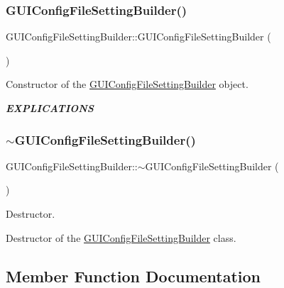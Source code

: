 \subsubsection{\texorpdfstring{G\+U\+I\+Config\+File\+Setting\+Builder()}{GUIConfigFileSettingBuilder()}}
{\footnotesize\ttfamily G\+U\+I\+Config\+File\+Setting\+Builder\+::\+G\+U\+I\+Config\+File\+Setting\+Builder (\begin{DoxyParamCaption}{ }\end{DoxyParamCaption})}



Constructor of the \mbox{\hyperlink{class_g_u_i_config_file_setting_builder}{G\+U\+I\+Config\+File\+Setting\+Builder}} object. 

{\itshape {\bfseries E\+X\+P\+L\+I\+C\+A\+T\+I\+O\+NS}} \mbox{\label{class_g_u_i_config_file_setting_builder_a45d779dad296769d2877cfeec2fcb60c}} 
\subsubsection{\texorpdfstring{$\sim$\+G\+U\+I\+Config\+File\+Setting\+Builder()}{~GUIConfigFileSettingBuilder()}}
{\footnotesize\ttfamily G\+U\+I\+Config\+File\+Setting\+Builder\+::$\sim$\+G\+U\+I\+Config\+File\+Setting\+Builder (\begin{DoxyParamCaption}{ }\end{DoxyParamCaption})}



Destructor. 

Destructor of the \mbox{\hyperlink{class_g_u_i_config_file_setting_builder}{G\+U\+I\+Config\+File\+Setting\+Builder}} class. 

\subsection{Member Function Documentation}
\mbox{\label{class_g_u_i_config_file_setting_builder_abbaa15d81d247c3bca68a03e31b78e3e}} 
